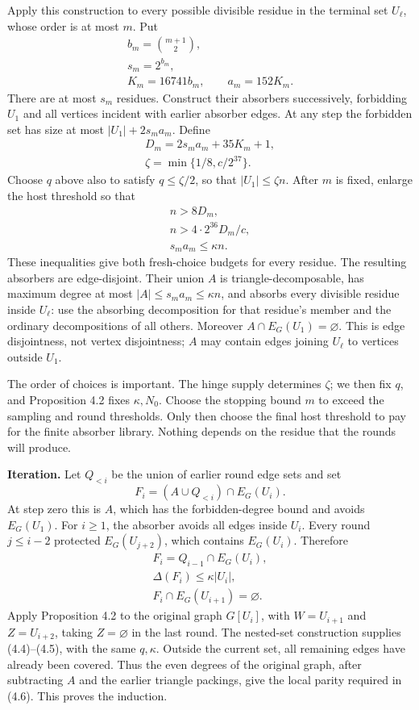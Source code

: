 \documentclass[english,11pt,a4paper]{article}
\begin{document}
Apply this construction to every possible divisible residue in the terminal set \(U_\ell\), whose order is at most \(m\). Put \[\begin{gathered}
b_m=\binom{m+1}{2},\\
s_m=2^{b_m},\\
K_m=16741b_m,\qquad a_m=152K_m.
\end{gathered}\] There are at most \(s_m\) residues. Construct their absorbers successively, forbidding \(U_1\) and all vertices incident with earlier absorber edges. At any step the forbidden set has size at most \(|U_1|+2s_ma_m\). Define \[\begin{gathered}
D_m=2s_ma_m+35K_m+1,\\
\zeta=\min\{1/8,c/2^{37}\}.
\end{gathered}\] Choose \(q\) above also to satisfy \(q\le\zeta/2\), so that \(|U_1|\le\zeta n\). After \(m\) is fixed, enlarge the host threshold so that \[\begin{gathered}
n>8D_m,\\
n>4\cdot2^{36}D_m/c,\\
s_ma_m\le\kappa n.
\end{gathered}\] These inequalities give both fresh-choice budgets for every residue. The resulting absorbers are edge-disjoint. Their union \(A\) is triangle-decomposable, has maximum degree at most \(|A|\le s_ma_m\le\kappa n\), and absorbs every divisible residue inside \(U_\ell\): use the absorbing decomposition for that residue's member and the ordinary decompositions of all others. Moreover \(A\cap E_G(U_1)=\varnothing\). This is edge disjointness, not vertex disjointness; \(A\) may contain edges joining \(U_\ell\) to vertices outside \(U_1\).

The order of choices is important. The hinge supply determines \(\zeta\); we then fix \(q\), and Proposition 4.2 fixes \(\kappa,N_0\). Choose the stopping bound \(m\) to exceed the sampling and round thresholds. Only then choose the final host threshold to pay for the finite absorber library. Nothing depends on the residue that the rounds will produce.

\textbf{Iteration.} Let \(Q_{<i}\) be the union of earlier round edge sets and set \[F_i=(A\cup Q_{<i})\cap E_G(U_i).
\tag{A.6}\] At step zero this is \(A\), which has the forbidden-degree bound and avoids \(E_G(U_1)\). For \(i\ge1\), the absorber avoids all edges inside \(U_i\). Every round \(j\le i-2\) protected \(E_G(U_{j+2})\), which contains \(E_G(U_i)\). Therefore \[\begin{gathered}
F_i=Q_{i-1}\cap E_G(U_i),\\
\Delta(F_i)\le\kappa|U_i|,\\
F_i\cap E_G(U_{i+1})=\varnothing.
\end{gathered}\] Apply Proposition 4.2 to the original graph \(G[U_i]\), with \(W=U_{i+1}\) and \(Z=U_{i+2}\), taking \(Z=\varnothing\) in the last round. The nested-set construction supplies (4.4)--(4.5), with the same \(q,\kappa\). Outside the current set, all remaining edges have already been covered. Thus the even degrees of the original graph, after subtracting \(A\) and the earlier triangle packings, give the local parity required in (4.6). This proves the induction.
\end{document}
